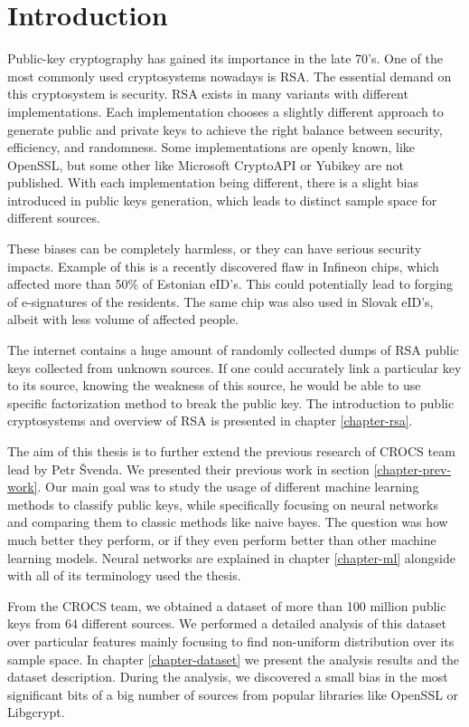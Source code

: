 \chapter{Introduction}

Public-key cryptography has gained its importance in the late 70's. One of the most commonly used cryptosystems nowadays is RSA. The essential demand on this cryptosystem is security. RSA exists in many variants with different implementations. Each implementation chooses a slightly different approach to generate public and private keys to achieve the right balance between security, efficiency, and randomness. Some implementations are openly known, like OpenSSL, but some other like Microsoft CryptoAPI or Yubikey are not published. With each implementation being different, there is a slight bias introduced in public keys generation, which leads to distinct sample space for different sources. 

These biases can be completely harmless, or they can have serious security impacts. Example of this is a recently discovered flaw in Infineon chips\cite{svenda_2}, which affected more than 50\% of Estonian eID's. This could potentially lead to forging of e-signatures of the residents. The same chip was also used in Slovak eID's, albeit with less volume of affected people.

The internet contains a huge amount of randomly collected dumps of RSA public keys collected from unknown sources. If one could accurately link a particular key to its source, knowing the weakness of this source, he would be able to use specific factorization method to break the public key. The introduction to public cryptosystems and overview of RSA is presented in chapter \ref{chapter-rsa}.

The aim of this thesis is to further extend the previous research of CROCS team \cite{svenda_1}\cite{svenda_3} lead by Petr Švenda. We presented their previous work in section \ref{chapter-prev-work}. Our main goal was to study the usage of different machine learning methods to classify public keys, while specifically focusing on neural networks and comparing them to classic methods like naive bayes. The question was how much better they perform, or if they even perform better than other machine learning models. Neural networks are explained in chapter \ref{chapter-ml} alongside with all of its terminology used the thesis.

From the CROCS team, we obtained a dataset of more than 100 million public keys from 64 different sources. We performed a detailed analysis of this dataset over particular features mainly focusing to find non-uniform distribution over its sample space. In chapter \ref{chapter-dataset} we present the analysis results and the dataset description. During the analysis, we discovered a small bias in the most significant bits of a big number of sources from popular libraries like OpenSSL or Libgcrypt.

